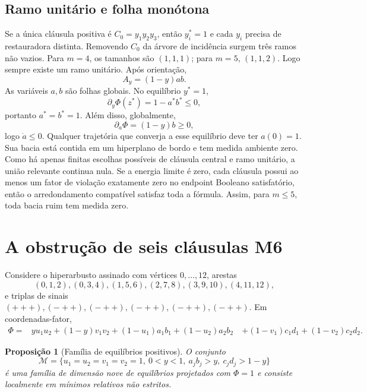 \documentclass[11pt,a4paper]{article}
\newtheorem{proposition}[theorem]{Proposição}
\newcommand{\Mmot}{\mathcal M}
\begin{document}
\subsection{Ramo unitário e folha monótona}
Se a única cláusula positiva é $C_0=y_1y_2y_3$, então $y_i^*=1$ e cada $y_i$ precisa de restauradora distinta. Removendo $C_0$ da árvore de incidência surgem três ramos não vazios. Para $m=4$, os tamanhos são $(1,1,1)$; para $m=5$, $(1,1,2)$. Logo sempre existe um ramo unitário. Após orientação,
\begin{equation}
A_y=(1-y)ab.
\end{equation}
As variáveis $a,b$ são folhas globais. No equilíbrio $y^*=1$,
\[
\partial_y\Phi(z^*)=1-a^*b^*\le0,
\]
portanto $a^*=b^*=1$. Além disso, globalmente,
\begin{equation}
\partial_a\Phi=(1-y)b\ge0,
\end{equation}
logo $\dot a\le0$. Qualquer trajetória que converja a esse equilíbrio deve ter $a(0)=1$. Sua bacia está contida em um hiperplano de bordo e tem medida ambiente zero. Como há apenas finitas escolhas possíveis de cláusula central e ramo unitário, a união relevante continua nula. Se a energia limite é zero, cada cláusula possui ao menos um fator de violação exatamente zero no endpoint Booleano satisfatório, então o arredondamento compatível satisfaz toda a fórmula. Assim, para $m\le5$, toda bacia ruim tem medida zero.

\section{A obstrução de seis cláusulas M6}
Considere o hiperarbusto assinado com vértices $0,\ldots,12$, arestas
\[
(0,1,2),(0,3,4),(1,5,6),(2,7,8),(3,9,10),(4,11,12),
\]
e triplas de sinais $(+++),(-++),(-++),(-++),(-++),(-++)$. Em coordenadas-fator,
\begin{align}
\Phi={}&yu_1u_2+(1-y)v_1v_2+(1-u_1)a_1b_1+(1-u_2)a_2b_2\
&+(1-v_1)c_1d_1+(1-v_2)c_2d_2.
\end{align}

\begin{proposition}[Família de equilíbrios positivos]
O conjunto
\[
\Mmot=\{u_1=u_2=v_1=v_2=1,\ 0<y<1,\ a_jb_j>y,\ c_jd_j>1-y\}
\]
é uma família de dimensão nove de equilíbrios projetados com $\Phi=1$ e consiste localmente em mínimos relativos não estritos.
\end{proposition}
\end{document}

